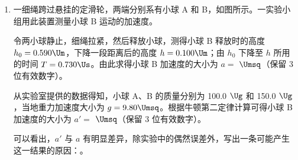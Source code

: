 \documentclass[\gkver]{gaokaozhenti}
\begin{document}
\begin{enumerate}
{$mv_{1}+m_{0}v_{0}=mv_{2}-m_{0}v_{0}$

解得 $v_{2}=\frac{3m_{0}}{m}v_{0}$

第 3 次推出后

$mv_{2}+m_{0}v_{0}=mv_{3}-m_{0}v_{0}$

解得 $v_{3}=\frac{5m_{0}}{m}v_{0}$

依次类推，第 8 次推出后，运动员的速度 $v_{8}=\frac{15m_{0}}{m}v_{0}$

根据题意可知 $v_{8}=\frac{15m_{0}}{m}v_{0}>5\Ums$

解得 $m<60\Ukg$

第 7 次运动员的速度一定小于 $5\Ums$，则 $v_{7}=\frac{13m_{0}}{m}v_{0}<5\Ums$，解得 $m>52\Ukg$。

综上所述，运动员的质量满足 $52\Ukg<m<60\Ukg$，AD 错误，BC 正确。

故选 BC。
}

\item
一细绳跨过悬挂的定滑轮，两端分别系有小球 A 和 B，如图所示。一实验小组用此装置测量小球 B 运动的加速度。

令两小球静止，细绳拉紧，然后释放小球，测得小球 B 释放时的高度 $h_{0}=0.590\Um$，下降一段距离后的高度 $h=0.100\Um$；由 $h_{0}$ 下降至 $h$ 所用的时间 $T=0.730\Us$。由此求得小球 B 加速度的大小为 $a=$ $\Umsq$（保留 3 位有效数字）。

从实验室提供的数据得知，小球 A、B 的质量分别为 100.0 $\Ug$ 和 150.0 $\Ug$，当地重力加速度大小为 $g=9.80\Umsq$。根据牛顿第二定律计算可得小球 B 加速度的大小为 $a'=$ $\Umsq$（保留 3 位有效数字）。

可以看出，$a'$ 与 $a$ 有明显差异，除实验中的偶然误差外，写出一条可能产生这一结果的原因：。

\onepicture[w=2.60cm]{}
\end{enumerate}
\end{document}
